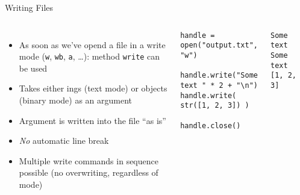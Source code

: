 \begin{frame}[fragile]{Writing Files}
%
\begin{columns}[T]
\begin{itemize}
\item As soon as we've opend a file in a write mode (\texttt{w}, \texttt{wb}, \texttt{a}, \ldots): method \texttt{write} can be used
\item Takes either ings (text mode) or  objects (binary mode) as an argument
\item Argument is written into the file \enquote{as is}
\item \emph{No} automatic line break
\item Multiple write commands in sequence possible (no overwriting, regardless of mode)
\end{itemize}
%
\begin{codebox}
\begin{verbatim}
handle = open("output.txt", "w")

handle.write("Some text " * 2 + "\n")
handle.write( str([1, 2, 3]) )

handle.close()
\end{verbatim}
\end{codebox}
%
\begin{cmdbox}
\begin{verbatim}
Some text Some text
[1, 2, 3]
\end{verbatim}
\end{cmdbox}
\end{columns}
%
\end{frame}


